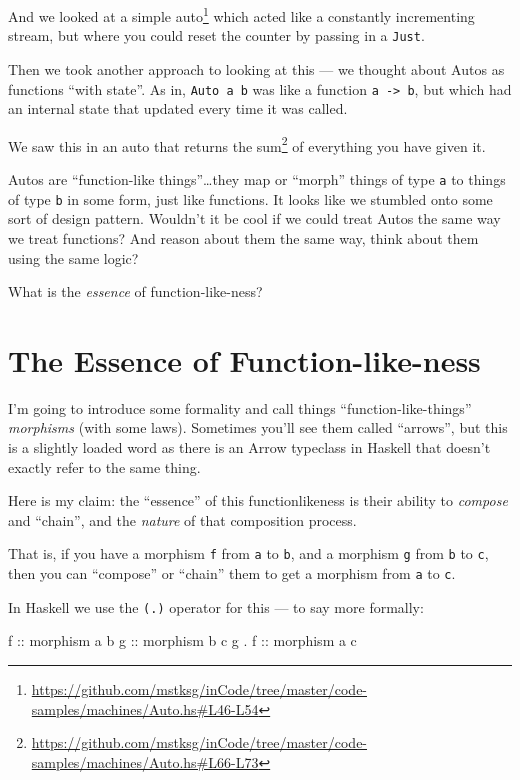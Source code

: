 \documentclass[]{article}
\newenvironment{Shaded}{}{}
\newcommand{\NormalTok}[1]{#1}
\newcommand{\OperatorTok}[1]{\textcolor[rgb]{0.40,0.40,0.40}{#1}}
\newcommand{\OtherTok}[1]{\textcolor[rgb]{0.00,0.44,0.13}{#1}}
\renewcommand{\href}[2]{#2\footnote{\url{#1}}}
\begin{document}
And we looked at
\href{https://github.com/mstksg/inCode/tree/master/code-samples/machines/Auto.hs\#L46-L54}{a
simple auto} which acted like a constantly incrementing stream, but where you
could reset the counter by passing in a \texttt{Just}.

Then we took another approach to looking at this --- we thought about Autos as
functions ``with state''. As in, \texttt{Auto\ a\ b} was like a function
\texttt{a\ -\textgreater{}\ b}, but which had an internal state that updated
every time it was called.

We saw this in an auto that
\href{https://github.com/mstksg/inCode/tree/master/code-samples/machines/Auto.hs\#L66-L73}{returns
the sum} of everything you have given it.

Autos are ``function-like things''\ldots they map or ``morph'' things of type
\texttt{a} to things of type \texttt{b} in some form, just like functions. It
looks like we stumbled onto some sort of design pattern. Wouldn't it be cool if
we could treat Autos the same way we treat functions? And reason about them the
same way, think about them using the same logic?

What is the \emph{essence} of function-like-ness?

\section{The Essence of
Function-like-ness}\label{the-essence-of-function-like-ness}

I'm going to introduce some formality and call things ``function-like-things''
\emph{morphisms} (with some laws). Sometimes you'll see them called ``arrows'',
but this is a slightly loaded word as there is an Arrow typeclass in Haskell
that doesn't exactly refer to the same thing.

Here is my claim: the ``essence'' of this functionlikeness is their ability to
\emph{compose} and ``chain'', and the \emph{nature} of that composition process.

That is, if you have a morphism \texttt{f} from \texttt{a} to \texttt{b}, and a
morphism \texttt{g} from \texttt{b} to \texttt{c}, then you can ``compose'' or
``chain'' them to get a morphism from \texttt{a} to \texttt{c}.

In Haskell we use the \texttt{(.)} operator for this --- to say more formally:

\begin{Shaded}
\begin{Highlighting}[]
\OtherTok{f     ::}\NormalTok{ morphism a b}
\OtherTok{g     ::}\NormalTok{ morphism b c}
\NormalTok{g }\OperatorTok{.}\OtherTok{ f ::}\NormalTok{ morphism a c}
\end{Highlighting}
\end{Shaded}
\end{document}
